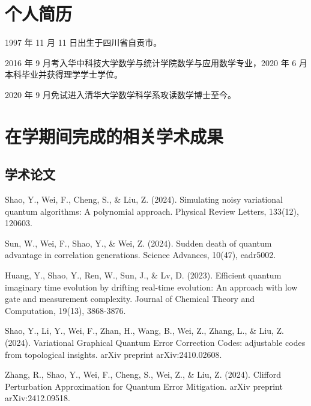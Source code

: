 
\begin{resume}

  \section*{个人简历}

  1997 年 11 月 11 日出生于四川省自贡市。

  2016 年 9 月考入华中科技大学数学与统计学院数学与应用数学专业，2020 年 6 月本科毕业并获得理学学士学位。

  2020 年 9 月免试进入清华大学数学科学系攻读数学博士至今。


  \section*{在学期间完成的相关学术成果}

  \subsection*{学术论文}

  \begin{achievements}
    \item Shao, Y., Wei, F., Cheng, S., \& Liu, Z. (2024). Simulating noisy variational quantum algorithms: A polynomial approach. Physical Review Letters, 133(12), 120603.
    \item Sun, W., Wei, F., Shao, Y., \& Wei, Z. (2024). Sudden death of quantum advantage in correlation generations. Science Advances, 10(47), eadr5002.
    \item Huang, Y., Shao, Y., Ren, W., Sun, J., \& Lv, D. (2023). Efficient quantum imaginary time evolution by drifting real-time evolution: An approach with low gate and measurement complexity. Journal of Chemical Theory and Computation, 19(13), 3868-3876.
    \item Shao, Y., Li, Y., Wei, F., Zhan, H., Wang, B., Wei, Z., Zhang, L., \& Liu, Z. (2024). Variational Graphical Quantum Error Correction Codes: adjustable codes from topological insights. arXiv preprint arXiv:2410.02608.
    \item Zhang, R., Shao, Y., Wei, F., Cheng, S., Wei, Z., \& Liu, Z. (2024). Clifford Perturbation Approximation for Quantum Error Mitigation. arXiv preprint arXiv:2412.09518.
  \end{achievements}



\end{resume}
